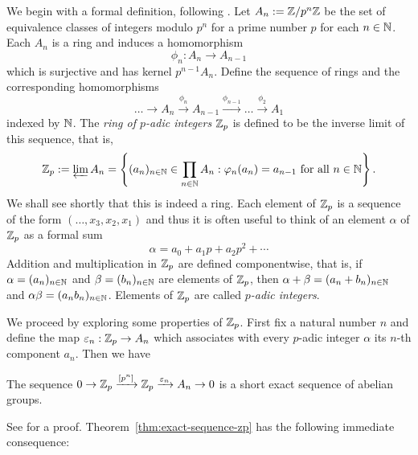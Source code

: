 We begin with a formal definition, following \cite{serre2012course}. Let \(A_n := \mathbb{Z}/p^n \mathbb{Z}\) be the set of equivalence classes of integers modulo \(p^n\) for a prime number \(p\) for each \(n \in \mathbb{N}\). Each \(A_n\) is a ring and induces a homomorphism\label{sec:padic-def}
\[
  \phi_n : A_{n} \to A_{n - 1}  
\]
which is surjective and has kernel \(p^{n-1}A_n\). Define the sequence of rings and the corresponding homomorphisms
\begin{equation*}
    \dots \to A_n \xrightarrow{\phi_n} A_{n - 1} \xrightarrow{\phi_{n - 1}} \dots \xrightarrow{\phi_2} A_1
\end{equation*}
indexed by \(\mathbb{N}\). The \emph{ring of \(p\)-adic integers} \(\mathbb{Z}_p\) is defined to be the inverse limit of this sequence, that is,
\[
  \mathbb{Z}_p := \varprojlim A_n = \left\{
    (a_n)_{n \in \mathbb{N}} \in \prod_{n \in \mathbb{N}} A_n : \varphi_n(a_n) = a_{n - 1} \text{ for all } n \in \mathbb{N}
  \right\}.
\]
We shall see shortly that this is indeed a ring. Each element of \(\mathbb{Z}_p\) is a sequence of the form \((\dots, x_3, x_2, x_1)\) and thus it is often useful to think of an element \(\alpha\) of \(\mathbb{Z}_p\) as a formal sum
\[
  \alpha = a_0 + a_1p + a_2p^2 + \cdots
\]
Addition and multiplication in \(\mathbb{Z}_p\) are defined componentwise, that is, if \(\alpha = (a_n)_{n \in \mathbb{N}}\) and \(\beta = (b_n)_{n \in \mathbb{N}}\) are elements of \(\mathbb{Z}_p\), then \(\alpha + \beta = (a_n + b_n)_{n \in \mathbb{N}}\) and \(\alpha\beta = (a_nb_n)_{n \in \mathbb{N}}\). Elements of \(\mathbb{Z}_p\) are called \emph{\(p\)-adic integers}.

We proceed by exploring some properties of \(\mathbb{Z}_p\). First fix a natural number \(n\) and define the map \(\varepsilon_n: \mathbb{Z}_p \to A_n\) which associates with every \(p\)-adic integer \(\alpha\) its \(n\)-th component \(a_n\). Then we have
\begin{theoremx}\label{thm:exact-sequence-zp}
    The sequence \(0 \to \mathbb{Z}_p \xrightarrow{[p^n]} \mathbb{Z}_p \xrightarrow{\varepsilon_n} A_n \to 0\) is a short exact sequence of abelian groups.
\end{theoremx}

See \cite[pp.~11--12]{serre2012course} for a proof. Theorem~\ref{thm:exact-sequence-zp} has the following immediate consequence:

